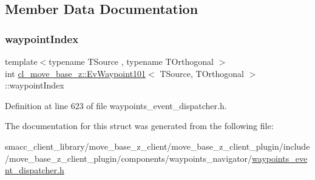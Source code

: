 \subsection{Member Data Documentation}
\mbox{\label{structcl__move__base__z_1_1EvWaypoint101_a18d1bd7e731e45e32874cb55c7a259c6}} 
\subsubsection{\texorpdfstring{waypoint\+Index}{waypointIndex}}
{\footnotesize\ttfamily template$<$typename T\+Source , typename T\+Orthogonal $>$ \\
int \hyperlink{structcl__move__base__z_1_1EvWaypoint101}{cl\+\_\+move\+\_\+base\+\_\+z\+::\+Ev\+Waypoint101}$<$ T\+Source, T\+Orthogonal $>$\+::waypoint\+Index}



Definition at line 623 of file waypoints\+\_\+event\+\_\+dispatcher.\+h.



The documentation for this struct was generated from the following file\+:\begin{DoxyCompactItemize}
\item 
smacc\+\_\+client\+\_\+library/move\+\_\+base\+\_\+z\+\_\+client/move\+\_\+base\+\_\+z\+\_\+client\+\_\+plugin/include/move\+\_\+base\+\_\+z\+\_\+client\+\_\+plugin/components/waypoints\+\_\+navigator/\hyperlink{waypoints__event__dispatcher_8h}{waypoints\+\_\+event\+\_\+dispatcher.\+h}\end{DoxyCompactItemize}
